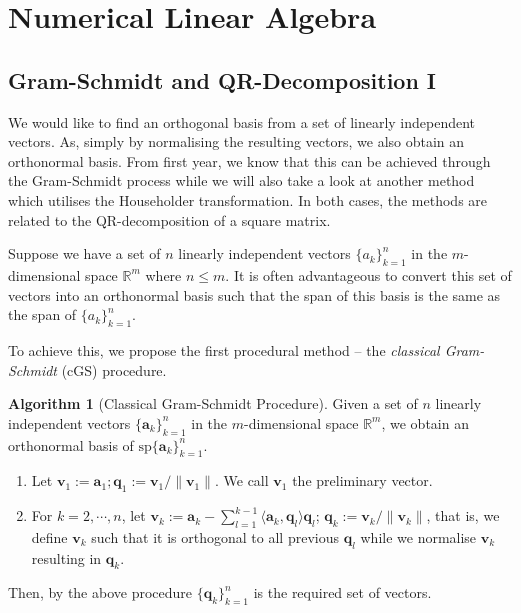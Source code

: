 \documentclass[
]{article}
\theoremstyle{definition}
\newtheorem{alg}{Algorithm}
\theoremstyle{definition}
\begin{document}
\hypertarget{numerical-linear-algebra}{%
\section{Numerical Linear Algebra}\label{numerical-linear-algebra}}

\hypertarget{gram-schmidt-and-qr-decomposition-i}{%
\subsection{Gram-Schmidt and QR-Decomposition
I}\label{gram-schmidt-and-qr-decomposition-i}}

We would like to find an orthogonal basis from a set of linearly
independent vectors. As, simply by normalising the resulting vectors, we
also obtain an orthonormal basis. From first year, we know that this can
be achieved through the Gram-Schmidt process while we will also take a
look at another method which utilises the Householder transformation. In
both cases, the methods are related to the QR-decomposition of a square
matrix.

Suppose we have a set of \(n\) linearly independent vectors
\(\{a_k\}_{k=1}^n\) in the \(m\)-dimensional space \(\mathbb{R}^m\)
where \(n \le m\). It is often advantageous to convert this set of
vectors into an orthonormal basis such that the span of this basis is
the same as the span of \(\{a_k\}_{k=1}^n\).

To achieve this, we propose the first procedural method -- the
\emph{classical Gram-Schmidt} (cGS) procedure.

\begin{alg}[Classical Gram-Schmidt Procedure]
  Given a set of \(n\) linearly independent vectors \(\{\mathbf{a}_k\}_{k=1}^n\) 
  in the \(m\)-dimensional space \(\mathbb{R}^m\), we obtain an orthonormal basis 
  of \(\text{sp} \{\mathbf{a}_k\}_{k=1}^n\).
  \begin{enumerate}
    \item Let \(\mathbf{v}_1 := \mathbf{a}_1; \mathbf{q}_1 := 
      \mathbf{v}_1 / \| \mathbf{v}_1 \|\). We call \(\mathbf{v}_1\) the preliminary vector.
    \item For \(k = 2, \cdots, n\),
      let \(\mathbf{v}_k := \mathbf{a}_k - \sum_{l = 1}^{k-1} \langle \mathbf{a}_k, 
        \mathbf{q}_l \rangle \mathbf{q}_l\); \(\mathbf{q}_k := \mathbf{v}_k / \|\mathbf{v}_k\|\),
        that is, we define \(\mathbf{v}_k\) such that it is orthogonal to all previous 
        \(\mathbf{q}_l\) while we normalise \(\mathbf{v}_k\) resulting in \(\mathbf{q}_k\).
  \end{enumerate}
  Then, by the above procedure \(\{\mathbf{q}_k\}_{k = 1}^n\) is the required set 
  of vectors.
\end{alg}
\end{document}
